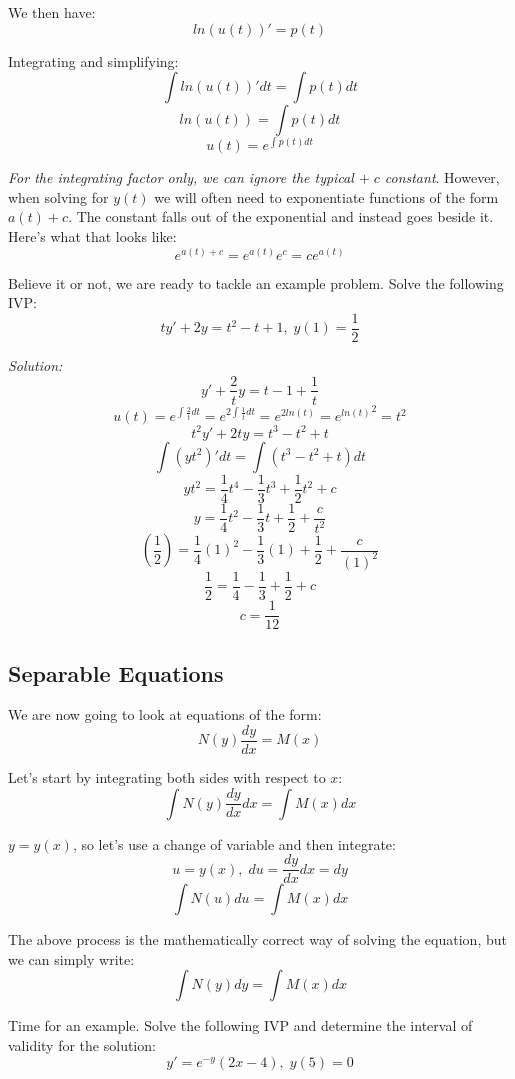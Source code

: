 We then have: $$ln(u(t))' = p(t)$$

Integrating and simplifying:
$$\int ln(u(t))'dt = \int p(t)dt$$
$$ln(u(t)) = \int p(t)dt$$
$$u(t) = e^{\int p(t)dt}$$

\textit{For the integrating factor only, we can ignore the typical $+\; c$ constant}. However, when solving for $y(t)$ we will often need to exponentiate functions of the form $a(t) + c$. The constant falls out of the exponential and instead goes beside it. Here's what that looks like:
$$e^{a(t) + c} = e^{a(t)}e^{c} = ce^{a(t)}$$

Believe it or not, we are ready to tackle an example problem. Solve the following IVP:
$$ty' + 2y = t^2 - t + 1,\; y(1) = \frac{1}{2}$$

\textit{Solution:}
$$y' + \frac{2}{t}y = t - 1 + \frac{1}{t}$$
$$u(t) = e^{\int \frac{2}{t}dt} = e^{2\int \frac{1}{t}dt} = e^{2ln(t)} = {e^{ln(t)}}^2 = t^{2}$$
$$t^{2}y' + 2ty = t^{3} - t^{2} + t$$
$$\int (yt^{2})'dt = \int (t^{3} - t^{2} + t)dt$$
$$yt^{2} = \frac{1}{4}t^{4} - \frac{1}{3}t^{3} + \frac{1}{2}t^{2} + c$$
$$y = \frac{1}{4}t^{2} - \frac{1}{3}t + \frac{1}{2} + \frac{c}{t^{2}}$$
$$\left(\frac{1}{2}\right) = \frac{1}{4}(1)^{2} - \frac{1}{3}(1) + \frac{1}{2} + \frac{c}{(1)^{2}}$$
$$\frac{1}{2} = \frac{1}{4} - \frac{1}{3} + \frac{1}{2} + c$$
$$c = \frac{1}{12}$$
\begin{center}
\end{center}

\pagebreak

\subsection{Separable Equations}
We are now going to look at equations of the form:
$$N(y)\frac{dy}{dx} = M(x)$$

Let's start by integrating both sides with respect to $x$:
$$\int N(y)\frac{dy}{dx}dx = \int M(x)dx$$

$y = y(x)$, so let's use a change of variable and then integrate:
$$u = y(x),\; du = \frac{dy}{dx}dx = dy$$
$$\int N(u)du = \int M(x)dx$$

The above process is the mathematically correct way of solving the equation, but we can simply write:
$$\int N(y)dy = \int M(x)dx$$

Time for an example. Solve the following IVP and determine the interval of validity for the solution:
$$y' = e^{-y}(2x - 4),\; y(5) = 0$$

